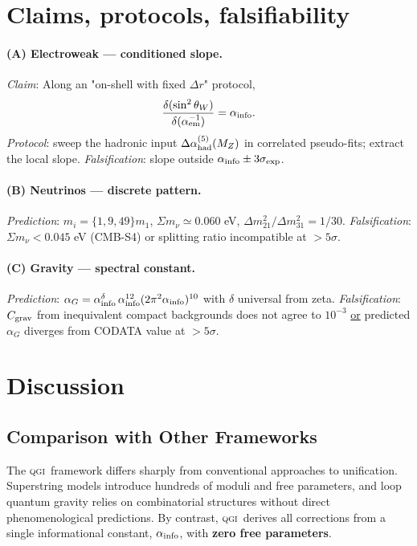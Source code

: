 \documentclass{article}
\numberwithin{equation}{section}
\theoremstyle{plain}
\theoremstyle{definition}
\theoremstyle{remark}
\newcommand{\qgi}{\textsc{qgi}}
\begin{document}
\section{Claims, protocols, falsifiability}
\label{sec:claims_tests}

\paragraph{(A) Electroweak — conditioned slope.}
\emph{Claim}: Along an "on-shell with fixed $\Delta r$" protocol,
\[
\frac{\delta(\sin^2\theta_W)}{\delta(\alpha_{\rm em}^{-1})}=\alpha_{\rm info}.
\]
\emph{Protocol}: sweep the hadronic input $\Delta\alpha^{(5)}_{\rm had}(M_Z)$ in correlated pseudo-fits; extract the local slope. \emph{Falsification}: slope outside $\alpha_{\rm info}\pm 3\sigma_{\rm exp}$.

\paragraph{(B) Neutrinos — discrete pattern.}
\emph{Prediction}: $m_i=\{1,9,49\}m_1$, $\Sigma m_\nu\simeq 0.060$ eV, $\Delta m^2_{21}/\Delta m^2_{31}=1/30$. \emph{Falsification}: $\Sigma m_\nu<0.045$ eV (CMB-S4) or splitting ratio incompatible at $>5\sigma$.

\paragraph{(C) Gravity — spectral constant.}
\emph{Prediction}: $\alpha_G=\alpha_{\rm info}^{\delta}\,\alpha_{\rm info}^{12}(2\pi^2\alpha_{\rm info})^{10}$ with $\delta$ universal from zeta. \emph{Falsification}: $C_{\rm grav}$ from inequivalent compact backgrounds does not agree to $10^{-3}$ \underline{or} predicted $\alpha_G$ diverges from CODATA value at $>5\sigma$.

\section{Discussion}
\label{sec:discussion}

\subsection{Comparison with Other Frameworks}
The \qgi\ framework differs sharply from conventional approaches to unification. 
Superstring models introduce hundreds of moduli and free parameters, and loop quantum gravity relies on combinatorial structures without direct phenomenological predictions. 
By contrast, \qgi\ derives all corrections from a single informational constant, $\alpha_{\rm info}$, with \textbf{zero free parameters}. 
\end{document}
